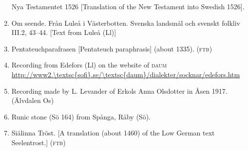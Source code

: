 \begin{enumerate}
\label{bkm:Ref137881523}Nya Testamentet 1526 [Translation of the New Testament into Swedish 1526].


\item[\sqbrSenum]

\label{bkm:Ref159658122}Om seende. Från Luleå i Västerbotten. Svenska landsmål och svenskt folkliv III.2, 43--44. [Text from Luleå (Ll)]

\item[\sqbrSenum]

\label{bkm:Ref137881441}Pentateuchparafrasen [Pentateuch paraphrasis] (about 1335). (\textsc{ftb})


\item[\sqbrSenum]

\label{bkm:Ref154213836}Recording from Edefors (Ll) on the website of \textsc{daum}\\
\url{http://www2.\textsc{sofi}.se/\textsc{daum}/dialekter/socknar/edefors.htm}

\item[\sqbrSenum]

\label{bkm:Ref154557175}Recording made by L. Levander of Erkols Anna Olsdotter in Åsen 1917. (Älvdalen Os)

\item[\sqbrSenum]

\label{bkm:Ref154220979}Runic stone (Sö 164) from Spånga, Råby (Sö).


\item[\sqbrSenum]

\label{bkm:Ref137881417}Siälinna Tröst. [A translation (about 1460) of the Low German text Seelentrost.] (\textsc{ftb})


\end{enumerate}
